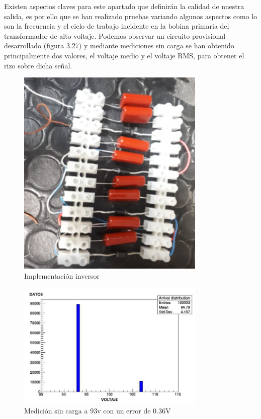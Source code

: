 Existen aspectos claves para este apartado que definirán la calidad de nuestra salida, es por ello que se han realizado pruebas variando algunos aspectos como lo son la frecuencia y el ciclo de trabajo incidente en la bobina primaria del transformador de alto voltaje. Podemos observar un circuito provisional desarrollado (figura 3.27) y mediante mediciones sin carga se han obtenido principalmente dos valores, el voltaje medio y el voltaje RMS, para obtener el rizo sobre dicha señal.



\begin{figure}[H]
\centering
\includegraphics[width=9cm]{Capitulo3/figs/fotomulti.png}
\caption{Implementación inversor}
\end{figure}

\begin{figure}[H]
\centering
\includegraphics[width=9cm]{Capitulo3/figs/93V.jpg}
\caption{Medición sin carga a 93v con un error de 0.36V}
\end{figure}


